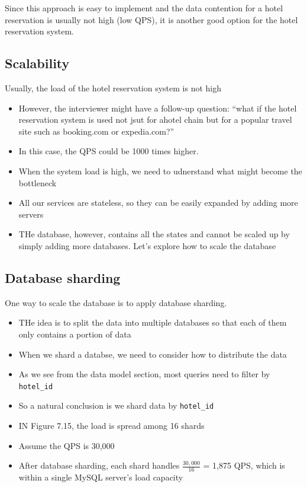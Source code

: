 \documentclass{report}
\theoremstyle{definition}
\let\oldsubsection\subsection
\renewcommand{\subsection}{\oldsubsection*}
\begin{document}
Since this approach is easy to implement and the data contention for a hotel reservation is usually not high (low QPS), it is another good option for the hotel reservation system.

\subsection{Scalability}

Usually, the load of the hotel reservation system is not high
\begin{itemize}
\item
However, the interviewer might have a follow-up question: ``what if the hotel reservation system is used not jsut for ahotel chain but for a popular travel site such as booking.com or expedia.com?''
\item
In this case, the QPS could be 1000 times higher.
\item
When the system load is high, we need to udnerstand what might become the bottleneck
\item
All our services are stateless, so they can be easily expanded by adding more servers
\item
THe database, however, contains all the states and cannot be scaled up by simply adding more databases. Let's explore how to scale the database
\end{itemize}

\subsection{Database sharding}

One way to scale the database is to apply database sharding.

\begin{itemize}
\item
THe idea is to split the data into multiple databases so that each of them only contains a portion of data
\item
When we shard a databse, we need to consider how to distribute the data
\item
As we see from the data model section, most queries need to filter by \lstinline|hotel_id|
\item
So a natural conclusion is we shard data by \lstinline|hotel_id|
\item
IN Figure 7.15, the load is spread among 16 shards
\item
Assume the QPS is 30,000
\item
After database sharding, each shard handles $\frac{30,000}{16}$ = 1,875 QPS, which is within a single MySQL server's load capacity
\end{itemize}
\end{document}
